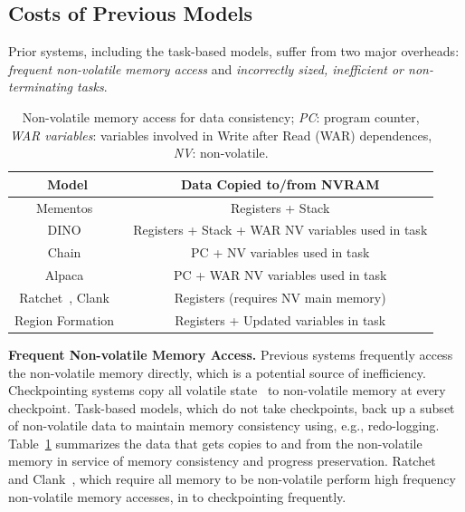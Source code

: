 \subsection{Costs of Previous Models}
\label{sec:cost_task-based}

Prior systems, including the task-based models, suffer from two major overheads:
{\em frequent non-volatile memory access} and {\em incorrectly sized, inefficient or non-terminating tasks}.

\begin{table}
	\centering
	\footnotesize
	\begin{tabular}{|c|c|}
		\hline
		Model & Data Copied to/from NVRAM \\
		\hline\hline
		Mementos~\cite{mementos}	& Registers + Stack     \\
		DINO~\cite{dino}	& Registers + Stack + WAR NV variables used in task\\
		Chain~\cite{chain}	& PC + NV variables used in task\\
		Alpaca~\cite{alpaca}	& PC + WAR NV variables used in task\\
		Ratchet~\cite{ratchet}, Clank~\cite{hicks_isca_2017} & Registers (requires NV main memory) \\
		Region Formation~\cite{baghsorkhi_cgo_2018} & Registers + Updated variables in task \\
		\hline
	\end{tabular}
	\caption{Non-volatile memory access for data consistency; \emph{PC}: program counter, \emph{WAR variables}: variables involved in Write after Read (WAR) dependences, \emph{NV}: non-volatile.}
	\label{table:chechpoint_comparison}
\end{table}


\textbf{Frequent Non-volatile Memory Access.} 
Previous systems frequently access the non-volatile memory directly, which 
is a potential source of inefficiency.  Checkpointing systems copy all volatile
state~\cite{dino, mementos, ratchet, hicks_isca_2017} to non-volatile memory at
every checkpoint.  Task-based models, which do not take checkpoints, back up a
subset of non-volatile data to maintain memory consistency using, e.g.,
redo-logging.  Table~\ref{table:chechpoint_comparison} summarizes the data that
gets copies to and from the non-volatile memory in service of memory
consistency and progress preservation.  Ratchet~\cite{ratchet} and
Clank~\cite{hicks_isca_2017}, which require all memory to be non-volatile
perform high frequency non-volatile memory accesses, in to checkpointing
frequently.

